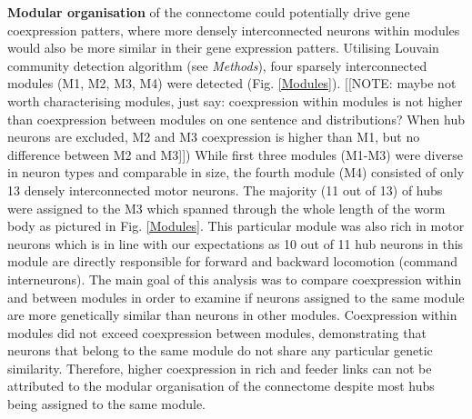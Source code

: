\documentclass[10pt,letterpaper]{article}
\begin{document}
\textbf{Modular organisation} of the connectome could potentially drive gene coexpression patters, where more densely interconnected neurons within modules would also be more similar in their gene expression patters. 
Utilising Louvain community detection algorithm (see \textit{Methods}), four sparsely interconnected modules (M1, M2, M3, M4) were detected (Fig. \ref{Modules}). 
[[NOTE: maybe not worth characterising modules, just say: coexpression within modules is not higher than coexpression between modules on one sentence and distributions? When hub neurons are excluded, M2 and M3 coexpression is higher than M1, but no difference between M2 and M3]])
While first three modules (M1-M3) were diverse in neuron types and comparable in size, the fourth module (M4) consisted of only 13 densely interconnected motor neurons. 
The majority (11 out of 13) of hubs were assigned to the M3 which spanned through the whole length of the worm body as pictured in Fig. \ref{Modules}. 
This particular module was also rich in motor neurons which is in line with our expectations as 10 out of 11 hub neurons in this module are directly responsible for forward and backward locomotion (command interneurons). 
The main goal of this analysis was to compare coexpression within and between modules in order to examine if neurons assigned to the same module are more genetically similar than neurons in other modules. 
Coexpression within modules did not exceed coexpression between modules, demonstrating that neurons that belong to the same module do not share any particular genetic similarity. 
Therefore, higher coexpression in rich and feeder links can not be attributed to the modular organisation of the connectome despite most hubs being assigned to the same module. 
\end{document}
